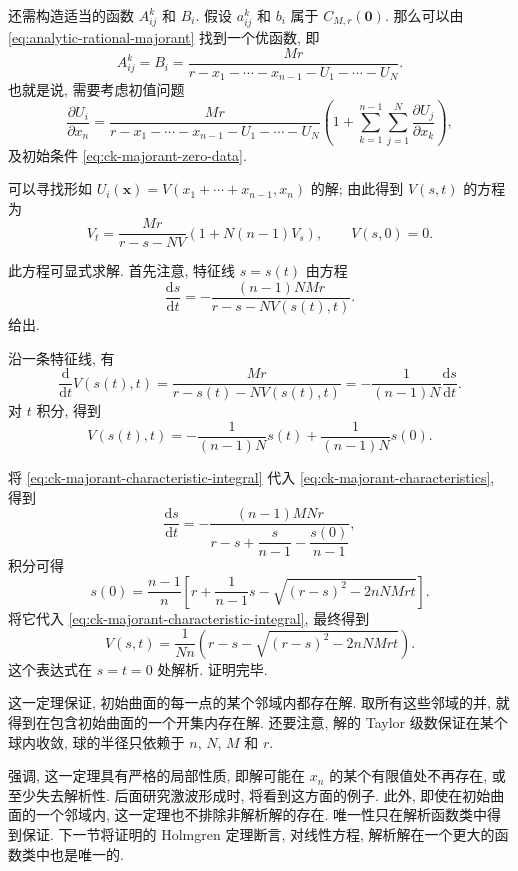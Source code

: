 \begin{Proof}
还需构造适当的函数 $A_{ij}^k$ 和 $B_i$. 假设 $a_{ij}^k$ 和 $b_i$ 属于 $C_{M,r}(\bm{0})$. 那么可以由 \eqref{eq:analytic-rational-majorant} 找到一个优函数, 即
\begin{equation}\label{eq:ck-rational-coefficient-majorants}
A_{ij}^k=B_i=\dfrac{Mr}{r-x_1-\cdots-x_{n-1}-U_1-\cdots-U_N}.
\end{equation}
也就是说, 需要考虑初值问题
\begin{equation}\label{eq:ck-rational-majorant-system}
\dfrac{\partial U_i}{\partial x_n}=\dfrac{Mr}{r-x_1-\cdots-x_{n-1}-U_1-\cdots-U_N}\left(1+\sum_{k=1}^{n-1}\sum_{j=1}^N\dfrac{\partial U_j}{\partial x_k}\right),
\end{equation}
及初始条件 \eqref{eq:ck-majorant-zero-data}.

可以寻找形如 $U_i(\bm{x})=V(x_1+\cdots+x_{n-1},x_n)$ 的解; 由此得到 $V(s,t)$ 的方程为
\begin{equation}\label{eq:ck-scalar-majorant-problem}
V_t=\dfrac{Mr}{r-s-NV}(1+N(n-1)V_s),\qquad V(s,0)=0.
\end{equation}


此方程可显式求解. 首先注意, 特征线 $s=s(t)$ 由方程
\begin{equation}\label{eq:ck-majorant-characteristics}
\dfrac{\mathrm{d}s}{\mathrm{d}t}=-\dfrac{(n-1)NMr}{r-s-NV(s(t),t)}.
\end{equation}
给出.

沿一条特征线, 有
\begin{equation}\label{eq:ck-majorant-along-characteristic}
\dfrac{\mathrm{d}}{\mathrm{d}t}V(s(t),t)=\dfrac{Mr}{r-s(t)-NV(s(t),t)}=-\dfrac1{(n-1)N}\dfrac{\mathrm{d}s}{\mathrm{d}t}.
\end{equation}
对 $t$ 积分, 得到
\begin{equation}\label{eq:ck-majorant-characteristic-integral}
V(s(t),t)=-\dfrac1{(n-1)N}s(t)+\dfrac1{(n-1)N}s(0).
\end{equation}


将 \eqref{eq:ck-majorant-characteristic-integral} 代入 \eqref{eq:ck-majorant-characteristics}, 得到
\begin{equation}\label{eq:ck-reduced-characteristic-equation}
\dfrac{\mathrm{d}s}{\mathrm{d}t}=-\dfrac{(n-1)MNr}{r-s+\dfrac{s}{n-1}-\dfrac{s(0)}{n-1}},
\end{equation}
积分可得
\begin{equation}\label{eq:ck-initial-characteristic-coordinate}
s(0)=\dfrac{n-1}{n}\left[r+\dfrac1{n-1}s-\sqrt{(r-s)^2-2nNMrt}\right].
\end{equation}
将它代入 \eqref{eq:ck-majorant-characteristic-integral}, 最终得到
\begin{equation}\label{eq:ck-explicit-scalar-majorant}
V(s,t)=\dfrac1{Nn}\left(r-s-\sqrt{(r-s)^2-2nNMrt}\right).
\end{equation}
这个表达式在 $s=t=0$ 处解析. 证明完毕.\end{Proof}

这一定理保证, 初始曲面的每一点的某个邻域内都存在解. 取所有这些邻域的并, 就得到在包含初始曲面的一个开集内存在解. 还要注意, 解的 Taylor 级数保证在某个球内收敛, 球的半径只依赖于 $n$, $N$, $M$ 和 $r$.

强调, 这一定理具有严格的局部性质, 即解可能在 $x_n$ 的某个有限值处不再存在, 或至少失去解析性. 后面研究激波形成时, 将看到这方面的例子. 此外, 即使在初始曲面的一个邻域内, 这一定理也不排除非解析解的存在. 唯一性只在解析函数类中得到保证. 下一节将证明的 Holmgren 定理断言, 对线性方程, 解析解在一个更大的函数类中也是唯一的.
